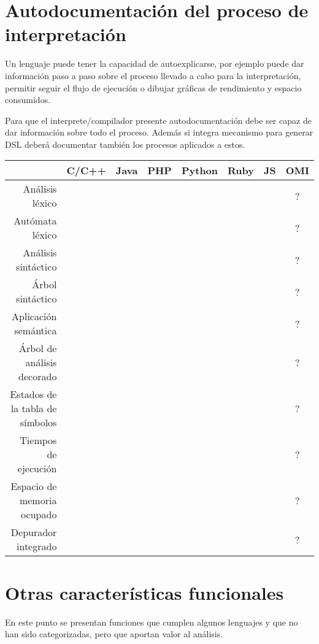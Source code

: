 \section{Autodocumentación del proceso de interpretación} 
Un lenguaje puede tener la capacidad de autoexplicarse, por ejemplo puede dar información 
paso a paso sobre el proceso llevado a cabo para la interpretación, permitir 
seguir el flujo de ejecución o dibujar gráficas de rendimiento y espacio consumidos.

Para que el interprete/compilador presente autodocumentación debe ser capaz de dar información sobre todo 
el proceso. Además si integra mecanismo para generar DSL deberá documentar también los procesos
aplicados a estos. 

\FloatBarrier
\begin{table}[h]
\begin{center}
 
\begin{tabular}{|r|c|c|c|c|c|c|c|} \hline
 & C/C++ & Java & PHP  & Python & Ruby & JS & OMI\\ \hline
Análisis léxico & &  &  &  &   &   & ? \\ \hline
Autómata léxico & & &  &  &   &   & ? \\ \hline
Análisis sintáctico & & &  &  &   &   & ? \\ \hline
Árbol sintáctico & & &  &  &   &   & ? \\ \hline
Aplicación semántica & & &  &  &   &   & ? \\ \hline
Árbol de análisis decorado & & &  &  &   &   & ? \\ \hline
Estados de la tabla de símbolos & & &  &  &   &   & ? \\ \hline
Tiempos de ejecución & & &  &  &   &   & ? \\ \hline
Espacio de memoria ocupado & & &  &  &   &   & ? \\ \hline
Depurador integrado & & &  &  &   &   & ? \\ \hline
\end{tabular}
\end{center}
\end{table}
\FloatBarrier



\section{Otras características funcionales}
En este punto se presentan funciones que cumplen algunos lenguajes
y que no han sido categorizadas, pero que aportan 
valor al análisis.

